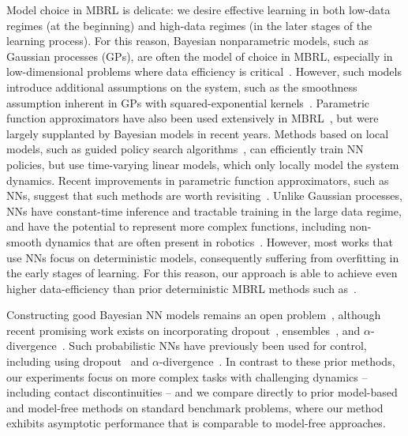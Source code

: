 
Model choice in MBRL is delicate: we desire effective learning in both low-data regimes (at the beginning) and high-data regimes (in the later stages of the learning process). 
For this reason, Bayesian nonparametric models, such as Gaussian processes (GPs), are often the model of choice in MBRL, especially in low-dimensional problems where data efficiency is critical~\citep{Kocijan2004,Ko2007,Nguyen-Tuong2008,Grancharova2008,Deisenroth2014,Kamthe2018}. 
However, such models introduce additional assumptions on the system, such as the smoothness assumption inherent in GPs with squared-exponential kernels~\citep{Rasmussen2003}.
Parametric function approximators have also been used extensively in MBRL~\citep{Hernandaz1990,Miller1990,Lin1992,Draeger1995}, but were largely supplanted by Bayesian models in recent years.
Methods based on local models, such as guided policy search algorithms~\citep{Levine2016,Finn2015,Chebotar2017}, can efficiently train NN policies, but use time-varying linear models, which only locally model the system dynamics.
Recent improvements in parametric function approximators, such as NNs, suggest that such methods are worth revisiting~\citep{Baranes2013,Fu2016,Punjani2015,Lenz2015,Agrawal2016,Gal2016,Depeweg2016,Williams2017,Nagabandi2017}.
Unlike Gaussian processes, NNs have constant-time inference and tractable training in the large data regime, and have the potential to represent more complex functions, including non-smooth dynamics that are often present in robotics~\citep{Fu2016,Mordatch2016,Nagabandi2017}.
However, most works that use NNs focus on deterministic models, consequently suffering from overfitting in the early stages of learning.
For this reason, our approach is able to achieve even higher data-efficiency than prior deterministic MBRL methods such as~\cite{Nagabandi2017}.

Constructing good Bayesian NN models remains an open problem~\citep{MacKay1992,neal1995bayesian,Osband2016a,Guo2017}, although recent promising work exists on incorporating dropout~\citep{gal2017concrete}, ensembles~\citep{Osband2016,Lakshminarayanan2017}, and $\alpha$-divergence~\citep{hernandez2016black}.
Such probabilistic NNs have previously been used for control, including using dropout~\cite{Gal2016,Higuera2018} and $\alpha$-divergence~\cite{Depeweg2016}.
In contrast to these prior methods, our experiments focus on more complex tasks with challenging dynamics -- including contact discontinuities -- and we compare directly to prior model-based and model-free methods on standard benchmark problems, where our method exhibits asymptotic performance that is comparable to model-free approaches.
